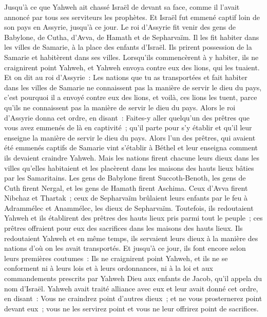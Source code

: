 \begin{multicols}{2}
Jusqu'à ce que Yahweh ait chassé Israël de devant sa face, comme il l'avait annoncé par tous ses serviteurs les prophètes. Et Israël fut emmené captif loin de son pays en Assyrie, jusqu'à ce jour.
Le roi d'Assyrie fit venir des gens de Babylone, de Cutha, d'Avva, de Hamath et de Sepharvaïm. Il les fit habiter dans les villes de Samarie, à la place des enfants d'Israël. Ils prirent possession de la Samarie et habitèrent dans ses villes.
Lorsqu'ils commencèrent à y habiter, ils ne craignirent point Yahweh, et Yahweh envoya contre eux des lions, qui les tuaient.
Et on dit au roi d'Assyrie~: Les nations que tu as transportées et fait habiter dans les villes de Samarie ne connaissent pas la manière de servir le dieu du pays, c'est pourquoi il a envoyé contre eux des lions, et voilà, ces lions les tuent, parce qu'ils ne connaissent pas la manière de servir le dieu du pays.
Alors le roi d'Assyrie donna cet ordre, en disant~: Faites-y aller quelqu'un des prêtres que vous avez emmenés de là en captivité~; qu'il parte pour s'y établir et qu'il leur enseigne la manière de servir le dieu du pays.
Alors l'un des prêtres, qui avaient été emmenés captifs de Samarie vint s'établir à Béthel et leur enseigna comment ils devaient craindre Yahweh.
Mais les nations firent chacune leurs dieux dans les villes qu'elles habitaient et les placèrent dans les maisons des hauts lieux bâties par les Samaritains.
Les gens de Babylone firent Succoth-Benoth, les gens de Cuth firent Nergal, et les gens de Hamath firent Aschima.
Ceux d'Avva firent Nibchaz et Thartak~; ceux de Sepharvaïm brûlaient leurs enfants par le feu à Adrammélec et Anammélec, les dieux de Sepharvaïm.
Toutefois, ils redoutaient Yahweh et ils établirent des prêtres des hauts lieux pris parmi tout le peuple~; ces prêtres offraient pour eux des sacrifices dans les maisons des hauts lieux.
Ils redoutaient Yahweh et en même temps, ils servaient leurs dieux à la manière des nations d'où on les avait transportés.
Et jusqu'à ce jour, ils font encore selon leurs premières coutumes~: Ils ne craignirent point Yahweh, et ils ne se conforment ni à leurs lois et à leurs ordonnances, ni à la loi et aux commandements prescrits par Yahweh Dieu aux enfants de Jacob, qu'il appela du nom d'Israël.
Yahweh avait traité alliance avec eux et leur avait donné cet ordre, en disant~: Vous ne craindrez point d'autres dieux~; et ne vous prosternerez point devant eux~; vous ne les servirez point et vous ne leur offrirez point de sacrifices.

\end{multicols}

